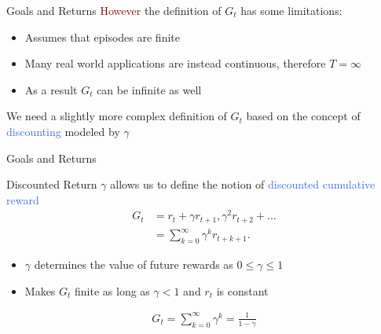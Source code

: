 \documentclass{beamer}
\begin{document}
\begin{frame}{Goals and Returns}
	\textcolor{Maroon}{However} the definition of $G_t$ has some limitations:
	\begin{itemize}
		\item Assumes that episodes are finite 
		\item Many real world applications are instead continuous, therefore $T=\infty$
		\item As a result $G_t$ can be infinite as well
	\end{itemize}

	\bigskip

	We need a slightly more complex definition of $G_t$ based on the concept of \textcolor{RoyalBlue}{discounting} modeled by $\gamma$  

\end{frame}

\begin{frame}{Goals and Returns}
	\begin{block}{Discounted Return}
  	 $\gamma$ allows us to define the notion of \textcolor{RoyalBlue}{discounted cumulative reward}	
		\begin{align*}
			G_t & = r_t+\gamma r_{t+1}, \gamma^{2} r_{t+2} + ... \\
				& = \sum_{k=0}^{\infty}\gamma^{k} r_{t+k+1}.
		\end{align*}

	\end{block}

	\begin{itemize}
		\item $\gamma$ determines the value of future rewards as $0\leq\gamma\leq1$
		\item Makes $G_t$ finite as long as $\gamma < 1$ and $r_t$ is constant
	\end{itemize}
	
	\centering
	\begin{align*}
		G_t = \sum_{k=0}^{\infty}\gamma^{k} = \frac{1}{1-\gamma}
	\end{align*}

\end{frame}


\end{document}
